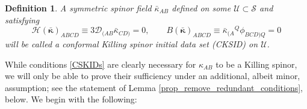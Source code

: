 \documentclass[10pt,a4paper]{article}
\theoremstyle{plain}
\newtheorem*{definition}{Definition}
\begin{document}
\begin{definition}{\em
A symmetric spinor field $\bar{\kappa}_{AB}$ defined on some
$\mathcal{U}\subset\mathcal{S}$ and satisfying
\begin{equation}
    \mathcal{H}(\bar{\bm\kappa})_{ABCD}\equiv
    3\mathcal{D}_{(AB}\bar{\kappa}_{CD)}=0,\qquad
    B(\bar{\bm\kappa})_{ABCD}\equiv
    \bar{\kappa}_{(A}{}^Q\phi_{BCD)Q}=0 \label{CSKIDs}
\end{equation}
will be called a \emph{conformal Killing spinor initial data set}
(\emph{CKSID}) on $\mathcal{U}$.}
\end{definition}

While conditions \eqref{CSKIDs} are clearly necessary for
$\kappa_{AB}$ to be a Killing spinor, we will only be able to prove
their sufficiency under an additional, albeit minor, assumption; see
the statement of Lemma \ref{prop_remove_redundant_conditions}, below.
We begin with the following:
\end{document}
